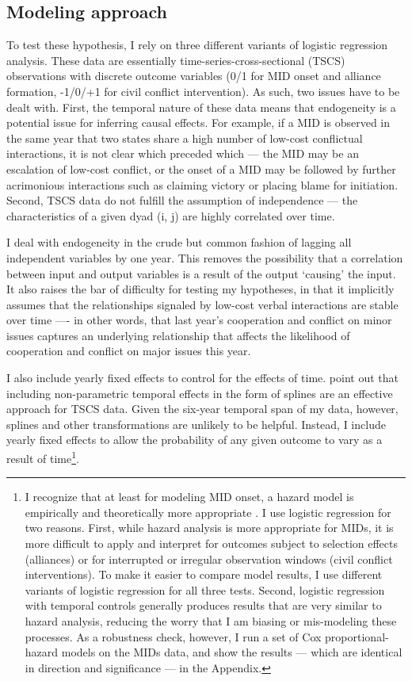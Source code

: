 \documentclass[10pt,]{article}
\begin{document}
\subsection{Modeling approach}\label{modeling-approach}

To test these hypothesis, I rely on three different variants of logistic
regression analysis. These data are essentially
time-series-cross-sectional (TSCS) observations with discrete outcome
variables (0/1 for MID onset and alliance formation, -1/0/+1 for civil
conflict intervention). As such, two issues have to be dealt with.
First, the temporal nature of these data means that endogeneity is a
potential issue for inferring causal effects. For example, if a MID is
observed in the same year that two states share a high number of
low-cost conflictual interactions, it is not clear which preceded which
--- the MID may be an escalation of low-cost conflict, or the onset of a
MID may be followed by further acrimonious interactions such as claiming
victory or placing blame for initiation. Second, TSCS data do not
fulfill the assumption of independence --- the characteristics of a
given dyad (i, j) are highly correlated over time.

I deal with endogeneity in the crude but common fashion of lagging all
independent variables by one year. This removes the possibility that a
correlation between input and output variables is a result of the output
`causing' the input. It also raises the bar of difficulty for testing my
hypotheses, in that it implicitly assumes that the relationships
signaled by low-cost verbal interactions are stable over time ---- in
other words, that last year's cooperation and conflict on minor issues
captures an underlying relationship that affects the likelihood of
cooperation and conflict on major issues this year.

I also include yearly fixed effects to control for the effects of time.
\citet[1283-1284]{Beck1998} point out that including non-parametric
temporal effects in the form of splines are an effective approach for
TSCS data. Given the six-year temporal span of my data, however, splines
and other transformations are unlikely to be helpful. Instead, I include
yearly fixed effects to allow the probability of any given outcome to
vary as a result of time\footnote{I recognize that at least for modeling
  MID onset, a hazard model is empirically and theoretically more
  appropriate \citep[see][ for a detailed
  discussion]{Box-Steffensmeir2004}. I use logistic regression for two
  reasons. First, while hazard analysis is more appropriate for MIDs, it
  is more difficult to apply and interpret for outcomes subject to
  selection effects (alliances) or for interrupted or irregular
  observation windows (civil conflict interventions). To make it easier
  to compare model results, I use different variants of logistic
  regression for all three tests. Second, logistic regression with
  temporal controls generally produces results that are very similar to
  hazard analysis, reducing the worry that I am biasing or mis-modeling
  these processes. As a robustness check, however, I run a set of Cox
  proportional-hazard models on the MIDs data, and show the results ---
  which are identical in direction and significance --- in the Appendix.}.
\end{document}
